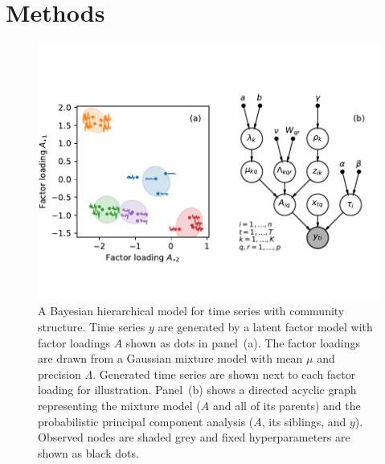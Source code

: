 \documentclass[onecolumn,pre,superscriptaddress, longbibliography, nofootinbib, notitlepage]{revtex4-1}
\begin{document}
\section{\label{sec:model}Methods}

\begin{figure}
    \includegraphics{cartoon-model.pdf}
    \caption{\label{fig:model} A Bayesian hierarchical model for time series with community structure. Time series $y$ are generated by a latent factor model with factor loadings $A$ shown as dots in panel~(a). The factor loadings are drawn from a Gaussian mixture model with mean $\mu$ and precision $\Lambda$. Generated time series are shown next to each factor loading for illustration. Panel~(b) shows a directed acyclic graph representing the mixture model ($A$ and all of its parents) and the probabilistic principal component analysis ($A$, its siblings, and $y$). Observed nodes are shaded grey and fixed hyperparameters are shown as black dots.}
\end{figure}
\end{document}
